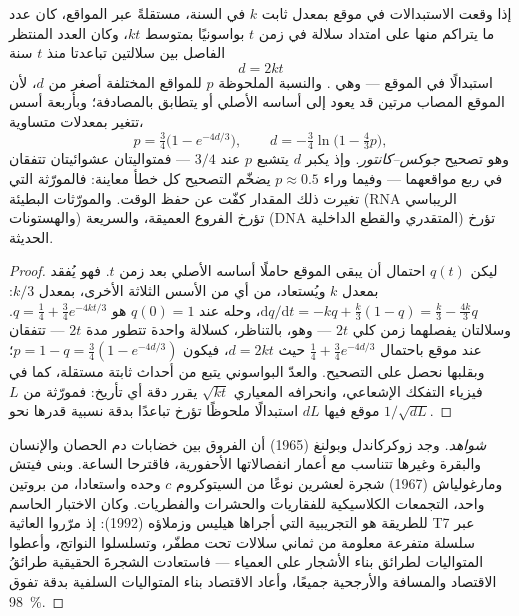 \begin{theorem}\label{thm:b2:phylogenetic-trees:clock}
إذا وقعت الاستبدالات في موقع بمعدل ثابت $k$ في السنة،
مستقلةً عبر المواقع، كان عدد ما يتراكم منها على امتداد
سلالة في زمن $t$ بواسونيًا بمتوسط $kt$، وكان العدد المنتظر
الفاصل بين سلالتين تباعدتا منذ $t$ سنة
\[
d = 2kt
\]
استبدالًا في الموقع --- وهي \emph{}. والنسبة الملحوظة
$p$ للمواقع المختلفة أصغر من $d$، لأن الموقع
المصاب مرتين قد يعود إلى أساسه الأصلي أو يتطابق بالمصادفة؛
وبأربعة أسس تتغير بمعدلات متساوية،
\[
p = \tfrac{3}{4}\bigl(1 - e^{-4d/3}\bigr), \qquad
d = -\tfrac{3}{4}\ln\bigl(1 - \tfrac{4}{3}p\bigr),
\]
وهو تصحيح \emph{جوكس--كانتور}. وإذ يكبر $d$ يتشبع $p$ عند
$3/4$ --- فمتواليتان عشوائيتان تتفقان في ربع مواقعهما
--- وفيما وراء $p \approx 0.5$ يضخّم التصحيح كل
خطأ معاينة: فالمورّثة التي تغيرت ذلك المقدار كفّت عن
حفظ الوقت. والمورّثات البطيئة (RNA الريباسي والهستونات) تؤرخ الفروع
العميقة، والسريعة (DNA المتقدري والقطع الداخلية) تؤرخ الحديثة.
\end{theorem}
\begin{proof}
ليكن $q(t)$ احتمال أن يبقى الموقع حاملًا أساسه
الأصلي بعد زمن $t$. فهو يُفقد بمعدل $k$ ويُستعاد،
من أي من الأسس الثلاثة الأخرى، بمعدل $k/3$:
$\mathrm{d}q/\mathrm{d}t = -kq + \tfrac{k}{3}(1 - q) = \tfrac{k}{3} -
\tfrac{4k}{3}q$، وحله عند $q(0) = 1$ هو $q = \tfrac14 +
\tfrac34 e^{-4kt/3}$. وسلالتان يفصلهما زمن كلي $2t$ ---
وهو، بالتناظر، كسلالة واحدة تتطور مدة $2t$ --- تتفقان عند
موقع باحتمال $\tfrac14 + \tfrac34 e^{-4d/3}$ حيث $d =
2kt$، فيكون $p = 1 - q = \tfrac34(1 - e^{-4d/3})$؛ وبقلبها نحصل على
التصحيح. والعدّ البواسوني يتبع من أحداث ثابتة مستقلة،
كما في فيزياء التفكك الإشعاعي، وانحرافه
المعياري $\sqrt{kt}$ يقرر دقة أي تأريخ: فمورّثة من $L$
موقع فيها $dL$ استبدالًا ملحوظًا تؤرخ تباعدًا بدقة
نسبية قدرها نحو $1/\sqrt{dL}$.
\end{proof}
\begin{proof}[شواهد]
وجد زوكركاندل وبولنغ (1965) أن الفروق بين
خضابات دم الحصان والإنسان والبقرة وغيرها تتناسب مع
أعمار انفصالاتها الأحفورية، فاقترحا الساعة. وبنى فيتش
ومارغولياش (1967) شجرة لعشرين نوعًا من السيتوكروم
$c$ وحده واستعادا، من بروتين واحد، التجمعات
الكلاسيكية للفقاريات والحشرات والفطريات. وكان الاختبار الحاسم
للطريقة هو  التجريبية التي أجراها هيليس وزملاؤه (1992):
إذ مرّروا العاثية T7 عبر سلسلة متفرعة معلومة
من ثماني سلالات تحت مطفّر، وتسلسلوا النواتج، وأعطوا
المتواليات لطرائق بناء الأشجار على العمياء --- فاستعادت الشجرةَ الحقيقية
طرائقُ الاقتصاد والمسافة والأرجحية جميعًا،
وأعاد الاقتصاد بناء المتواليات السلفية بدقة تفوق
\qty{98}{\%}.
\end{proof}

